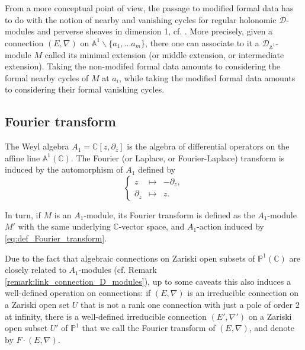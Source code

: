 \documentclass[11pt,a4paper]{amsart}
\numberwithin{equation}{section}
\begin{document}
\begin{remark}
\label{remark:link_connection_D_modules}
From a more conceptual point of view, the passage to modified formal data has to do with the notion of nearby and vanishing cycles for regular holonomic $\mathcal D$-modules and perverse sheaves in dimension 1, cf. \cite{arinkin2008fourier}. More precisely, given a connection $(E,\nabla)$ on $\mathbb A^1\smallsetminus\{a_1, \dots a_m\}$, there one can associate to it a $\mathcal D_{\mathbb A^1}$-module $M$ called its minimal extension (or middle extension, or intermediate extension). Taking the non-modifed formal data amounts to considering the formal nearby cycles of $M$ at $a_i$, while taking the modified formal data amounts to considering their formal vanishing cycles. 
\end{remark}









\subsection{Fourier transform}

The Weyl algebra $A_1=\mathbb C[z, \partial_z]$ is the algebra of differential operators on the affine line $\mathbb A^1(\mathbb C)$. The Fourier (or Laplace, or Fourier-Laplace) transform is induced by the automorphism of $A_1$ defined by
\begin{equation}
\label{eq:def_Fourier_transform}
\left\lbrace
\begin{array}{ccc}
z &\mapsto &-\partial_z,\\
\partial_z & \mapsto & z.
\end{array}
\right.
\end{equation}
 
In turn, if $M$ is an $A_1$-module, its Fourier transform is defined as the $A_1$-module $M'$ with the same underlying $\mathbb C$-vector space, and $A_1$-action induced by \eqref{eq:def_Fourier_transform}.

Due to the fact that algebraic connections on Zariski open subsets of $\mathbb P^1(\mathbb C)$ are closely related to $A_1$-modules (cf. Remark \ref{remark:link_connection_D_modules}), up to some caveats this also induces a well-defined operation on connections: if $(E,\nabla)$ is an irreducible connection on a Zariski open set $U$ that is not a rank one connection with just a pole of order 2 at infinity, there is a well-defined irreducible connection $(E', \nabla')$ on a Zariski open subset $U'$ of $\mathbb P^1$ that we call the Fourier transform of $(E,\nabla)$, and denote by $F\cdot (E,\nabla)$. 
\end{document}
